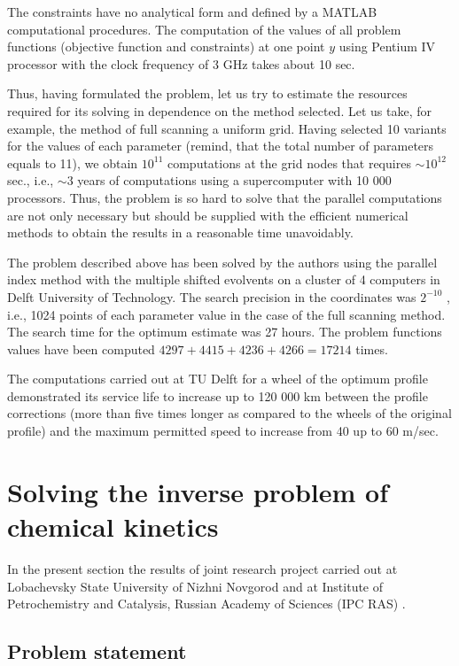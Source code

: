 The constraints have no analytical form and defined by a MATLAB computational procedures. The computation of the values of all problem functions (objective function and constraints) at one point $y$ using Pentium IV processor with the clock frequency of 3 GHz takes about 10 sec. 

Thus, having formulated the problem, let us try to estimate the resources required for its solving in dependence on the method selected. Let us take, for example, the method of full scanning a uniform grid. Having selected 10 variants for the values of each parameter (remind, that the total number of parameters equals to 11), we obtain $10^{11}$ computations at the grid nodes that requires $\sim 10^{12}$ sec., i.e., $\sim 3$ years of computations using a supercomputer with 10 000 processors. Thus, the problem is so hard to solve that the parallel computations are not only necessary but should be supplied with the efficient numerical methods to obtain the results in a reasonable time unavoidably.

The problem described above has been solved by the authors using the parallel index method with the multiple shifted evolvents on a cluster of 4 computers in Delft University of Technology. The search precision in the coordinates was $2^{-10}$ , i.e., 1024 points of each parameter value in the case of the full scanning method. The search time for the optimum estimate was 27 hours. The problem functions values have been computed $4297 + 4415 + 4236 + 4266 = 17214$ times.

The computations carried out at TU Delft for a wheel of the optimum profile demonstrated its service life to increase up to 120 000 km between the profile corrections (more than five times longer as compared to the wheels of the original profile) and the maximum permitted speed to increase from 40 up to 60 m/sec.

\section{Solving the inverse problem of chemical kinetics}

In the present section the results of joint research project carried out at Lobachevsky State University of Nizhni Novgorod and at Institute of Petrochemistry and Catalysis, Russian Academy of Sciences (IPC RAS) \cite{8_Gubaidullin2011}.

\subsection{Problem statement}

